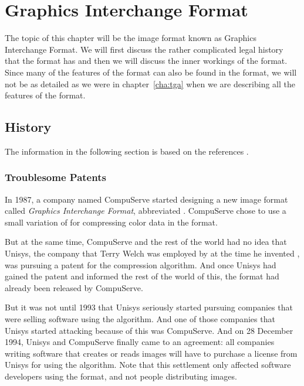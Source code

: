 \begin{comment}
  
\end{comment}

\chapter{Graphics Interchange Format}
\label{cha:gif}

The topic of this chapter will be the image format known as Graphics
Interchange Format. We will first discuss the rather complicated legal
history that the format has and then we will discuss the inner
workings of the format. Since many of the features of the \tga format
can also be found in the \gif format, we will not be as detailed as we
were in chapter~\ref{cha:tga} when we are describing all the features
of the \gif format.

\section{History}
\label{sec:gif-history}

The information in the following section is based on the references
\cite{welch85:_u,roelofs09:_histor_portab_networ_graph_png_format,battilana:_gif_contr,caie:_sad,roelofs99:_png}.


\subsection{Troublesome Patents}

\newcommand{\compus}{CompuServe\xspace}

In 1987, a company named \compus started designing a new image format
called \textit{Graphics Interchange Format}, abbreviated \gif. \compus
chose to use a small variation of \lzw for compressing color data in
the \gif format.

But at the same time, \compus and the rest of the world had no idea
that Unisys, the company that Terry Welch was employed by at the time
he invented \lzw, was pursuing a patent for the \lzw compression
algorithm. And once Unisys had gained the patent and informed the rest
of the world of this, the \gif format had already been released by
\compus.

But it was not until 1993 that Unisys seriously started pursuing
companies that were selling software using the \lzw algorithm. And one
of those companies that Unisys started attacking because of this was
\compus. And on 28 December 1994, Unisys and \compus finally came to
an agreement: all companies writing software that creates or reads \gif
images will have to purchase a license from Unisys for using the \lzw
algorithm. Note that this settlement only affected software developers using the
\gif format, and not people distributing \gif images.

